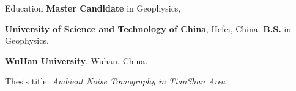 \begin{rubric}{Education}
\entry*[2017 -- present]
    \textbf{Master Candidate} in Geophysics,
    \par\textbf{University of Science and Technology of China}, Hefei, China.
\entry*[2013 -- 2017]%
    \textbf{B.S.} in Geophysics,
    \par\textbf{WuHan University}, Wuhan, China.
	\par Thesis title: \emph{Ambient Noise Tomography in TianShan Area}
\end{rubric}
